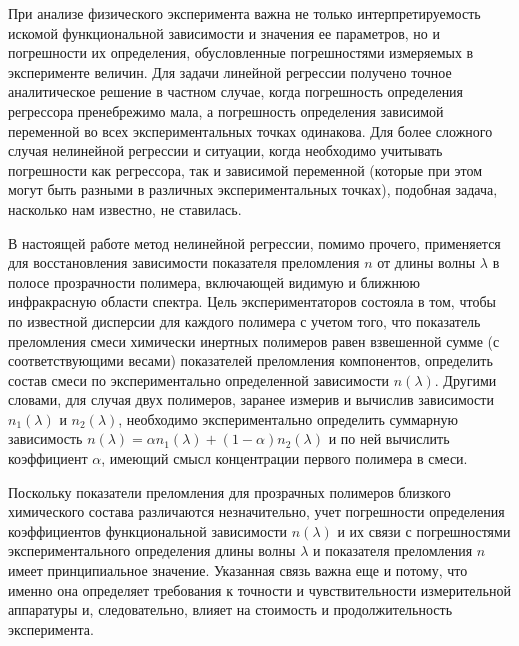 \documentclass[12pt,a4paper]{article}
\begin{document}
При анализе физического эксперимента важна не только интерпретируемость
искомой функциональной зависимости и значения ее параметров, но и погрешности их определения,
обусловленные погрешностями измеряемых в эксперименте величин. Для задачи
линейной регрессии получено точное аналитическое решение в частном случае, когда
погрешность определения регрессора пренебрежимо мала, а погрешность определения
зависимой переменной во всех экспериментальных точках одинакова\cite{Vatunin05}.
Для более сложного случая нелинейной регрессии и ситуации, когда необходимо
учитывать погрешности как регрессора, так и зависимой переменной (которые при
этом могут быть разными в различных экспериментальных точках), подобная задача,
насколько нам известно, не ставилась.

В настоящей работе метод нелинейной регрессии, помимо прочего, применяется для восстановления
зависимости показателя преломления $n$ от длины волны $\lambda$ в полосе
прозрачности полимера, включающей видимую и ближнюю инфракрасную области спектра.
Цель экспериментаторов состояла в том, чтобы по известной дисперсии для каждого
полимера с учетом того, что показатель преломления смеси химически инертных
полимеров равен взвешенной сумме (с соответствующими весами) показателей
преломления компонентов, определить состав смеси по экспериментально
определенной зависимости $n(\lambda)$. Другими словами, для случая двух
полимеров, заранее измерив и вычислив зависимости $n_1(\lambda)$ и $n_2(\lambda)$,
необходимо экспериментально определить суммарную зависимость
$n(\lambda) = \alpha n_1(\lambda) + (1 - \alpha) n_2(\lambda)$ и по ней
вычислить коэффициент $\alpha$, имеющий смысл концентрации первого полимера в
смеси.

Поскольку показатели преломления для прозрачных полимеров близкого химического
состава различаются незначительно, учет погрешности определения коэффициентов
функциональной зависимости $n(\lambda)$ и их связи с погрешностями
экспериментального определения длины волны $\lambda$ и показателя преломления
$n$ имеет принципиальное значение. Указанная связь важна еще и потому, что
именно она определяет требования к точности и чувствительности измерительной
аппаратуры и, следовательно, влияет на стоимость и продолжительность
эксперимента.
\end{document}
